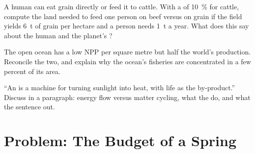 \begin{exercise}[$\star\star\star$]\label{exo:b1:ecosystem-organization:10}
A human can eat grain directly or feed it to cattle. With a  of \qty{10}{\%} for cattle, compute the land needed to
feed one person on beef versus on grain if the field yields
\qty{6}{t} of grain per hectare and a person needs \qty{1}{t} a year.
What does this say about the human  and the planet's
?
\end{exercise}

\begin{exercise}[$\star\star\star$]\label{exo:b1:ecosystem-organization:11}
The open ocean has a low NPP per square metre but half the world's
production. Reconcile the two, and explain why the ocean's fisheries
are concentrated in a few percent of its area.
\end{exercise}

\begin{exercise}[$\star\star\star$]\label{exo:b1:ecosystem-organization:12}
``An  is a machine for turning sunlight into heat, with life
as the by-product.'' Discuss in a paragraph: energy flow versus matter
cycling, what the  do, and what the sentence  out.
\end{exercise}

\section{Problem: The Budget of a Spring}

